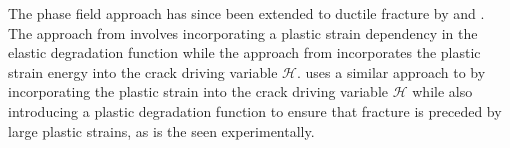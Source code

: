 \documentclass[sn-mathphys,Numbered]{sn-jnl}%
\begin{document}
The phase field approach has since been extended to ductile fracture by \citet{ambati_phase-field_2015, borden_phase-field_2016} and \citet{miehe_phase_2016}.
The approach from \citet{ambati_phase-field_2015} involves incorporating a plastic strain dependency in the elastic degradation function while the approach from \citet{miehe_phase_2016} incorporates the plastic strain energy into the crack driving variable $\mathcal{H}$.
\citet{borden_phase-field_2016} uses a similar approach to \citet{miehe_phase_2016} by incorporating the plastic strain into the crack driving variable $\mathcal{H}$ while also introducing a plastic degradation function to ensure that fracture is preceded by large plastic strains, as is the seen experimentally.



%
%
\end{document}
